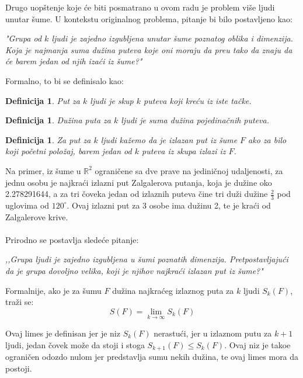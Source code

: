 \documentclass[11pt]{article}
\newtheorem{df}[teo]{\bf Definicija}
\begin{document}
\indent Drugo uop\v stenje koje \' ce biti posmatrano u ovom radu je problem vi\v se ljudi unutar \v sume. U kontekstu originalnog problema, pitanje bi bilo postavljeno kao:
\begin{center}
\textit{"Grupa od $k$ ljudi je zajedno izgubljena unutar \v sume poznatog oblika i dimenzija. Koja je najmanja suma du\v zina puteva koje oni moraju da pre\dj u tako da znaju da \' ce barem jedan od njih iza\' ci iz \v sume?"}
\end{center}
\newpage
Formalno, to bi se definisalo kao:
\begin{df} Put za $k$ ljudi je skup $k$ puteva koji kre\' cu iz iste ta\v cke. \end{df}
\begin{df} Du\v zina puta za $k$ ljudi je suma du\v zina pojedina\v cnih puteva.\end{df}
\begin{df} Za put za $k$ ljudi ka\v zemo da je izlazan put iz \v sume $F$ ako za bilo koji po\v cetni polo\v zaj, barem jedan od $k$ puteva iz skupa izlazi iz $F$.\end{df}
\smallskip

\indent Na primer, iz \v sume u $\mathbb{R}^2$ ograni\v cene sa dve prave na jedini\v cnoj udaljenosti, za jednu osobu je najkra\' ci izlazni put Zalgalerova putanja, koja je du\v zine oko 2.278291644, a za tri \v coveka jedan od izlaznih puteva \v cine tri du\v zi du\v zine $\frac{2}{3}$ pod uglovima od $120^\circ$. Ovaj izlazni put za 3 osobe ima du\v zinu 2, te je kra\' ci od Zalgalerove krive.
\\
\smallskip
\\
\indent Prirodno se postavlja slede\' ce pitanje:
\begin{center}
\textit{,,Grupa ljudi je zajedno izgubljena u \v sumi poznatih dimenzija. Pretpostavljaju\' ci da je grupa dovoljno velika, koji je njihov najkra\' ci izlazan put iz \v sume?"}
\end{center}
Formalnije, ako je za \v sumu $F$ du\v zina najkra\' ceg izlaznog puta za $k$ ljudi $S_k(F)$, tra\v zi se:
$$S(F)=\lim_{k \to \infty} S_k(F)$$

\indent Ovaj limes je definisan jer je niz $S_k(F)$ nerastu\' ci, jer u izlaznom putu za $k+1$ ljudi, jedan \v covek mo\v ze da stoji i stoga $S_{k+1}(F)\leqslant S_{k}(F)$. Ovaj niz je tako\dj e ograni\v cen odozdo nulom jer predstavlja sumu nekih du\v zina, te ovaj limes mora da postoji. 
\\
\end{document}

